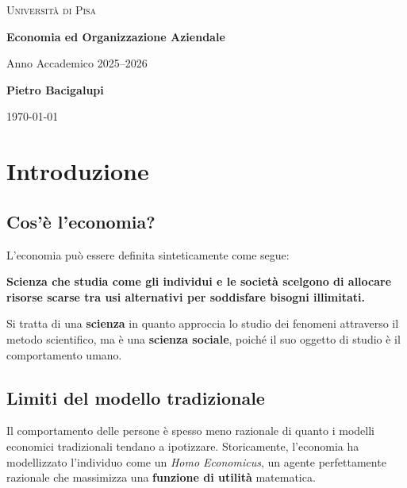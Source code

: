 \documentclass[a4paper,12pt]{article}
\begin{document}
	
	\begin{titlepage}
		\centering
		
		{\scshape\LARGE Università di Pisa \par}
		\vspace{0.5cm}
		
		{\Huge\bfseries Economia ed Organizzazione Aziendale \par}
		\vspace{0.5cm}
		{\Large Anno Accademico 2025--2026 \par}
		
		\vfill
		
		{\Large\textbf{Pietro Bacigalupi} \par}
		\vspace{0.5cm}
		
		\vfill
		
		{\large \today\par}
		
	\end{titlepage}
	
	\tableofcontents
	\newpage
	
	\section{Introduzione}
	
	\subsection{Cos'è l'economia?}
	
	L'economia può essere definita sinteticamente come segue:
	
	\begin{tcolorbox}[colback=blue!5,colframe=blue!75!black,title=Definizione di Economia]
		\textbf{Scienza che studia come gli individui e le società scelgono di allocare risorse scarse tra usi alternativi per soddisfare bisogni illimitati.}
	\end{tcolorbox}
	
	Si tratta di una \textbf{scienza} in quanto approccia lo studio dei fenomeni attraverso il metodo scientifico, ma è una \textbf{scienza sociale}, poiché il suo oggetto di studio è il comportamento umano. 
	
	\subsection{Limiti del modello tradizionale}
	Il comportamento delle persone è spesso meno razionale di quanto i modelli economici tradizionali tendano a ipotizzare. Storicamente, l'economia ha modellizzato l'individuo come un \textit{Homo Economicus}, un agente perfettamente razionale che massimizza una \textbf{funzione di utilità} matematica. 
	
\end{document}
